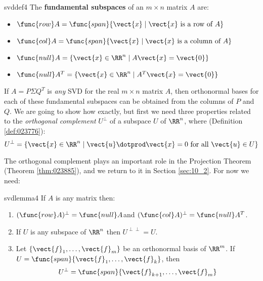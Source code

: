 \begin{definition}{}{svddef4} 
The \textbf{fundamental subspaces} of an $m\times n$ matrix $A$ are:

\begin{itemize}
\item[] $\func{row}A=\func{span}\{\vect{x}\mid \vect{x} \mbox{ is a row of } A\}$

\item[] $\func{col}A=\func{span}\{\vect{x}\mid \vect{x} \mbox{ is a column of } A\}$

\item[] $\func{null}A=\{\vect{x}\in \RR^{n}\mid A\vect{x}=\vect{0}\}$

\item[] $\func{null}A^{T}=\{\vect{x}\in \RR^{n}\mid A^{T}\vect{x}=\vect{0}\}$
\end{itemize}
\end{definition}

\noindent If $A=P\Sigma Q^{T}$ is \emph{any} SVD for the real $m\times n$
matrix $A$, then orthonormal bases for each of these fundamental subspaces can be obtained from the columns of $P$ and $Q$. We are going to show  how exactly, but
first we need three properties related to the \emph{orthogonal complement} $U^{\perp}$ of a subspace $U$ of $\RR^{n}$, where (Definition \ref{def:023776}):
\begin{equation*}
U^{\perp}=\{\vect{x}\in \RR^{n}\mid \vect{u} \dotprod \vect{x}=0 \mbox{ for all } \vect{u}\in U\}
\end{equation*}

\noindent The orthogonal complement plays an important role in the
Projection Theorem (Theorem \ref{thm:023885}), and we return to it in Section \ref{sec:10_2}. For
now we need:

\begin{lemma}{}{svdlemma4}
If $A$ is any matrix then:

\begin{enumerate}
\item $(\func{row}A)^{\perp}=\func{null}A$\quad and \quad $(\func{col}A)^{\perp}=\func{null}A^{T}$.

\item If $U$ is any subspace of $\RR^{n}$ then $U^{\perp\perp}=U$.

\item Let $\{\vect{f}_{1},\ldots ,\vect{f}_{m}\}$ be an orthonormal basis of $\RR^{m}$. If $U=\func{span}\{\vect{f}_{1},\ldots ,\vect{f}_{k}\}$, then
\begin{equation*}
U^{\perp}=\func{span}\{\vect{f}_{k+1},\ldots ,\vect{f}_{m}\}
\end{equation*}
\end{enumerate}
\end{lemma}

